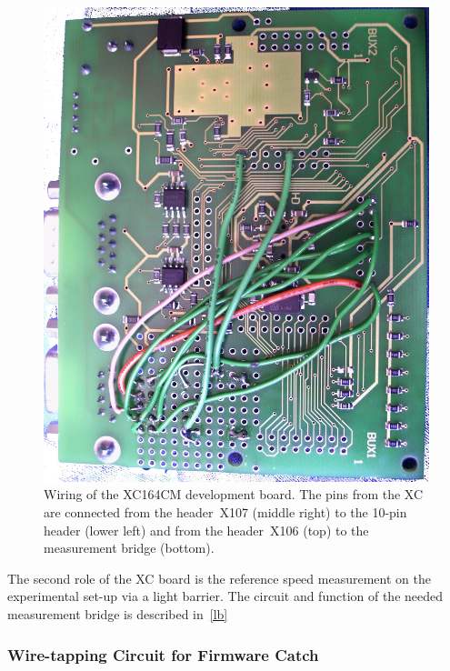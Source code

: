 \documentclass[12pt,a4paper]{article}
\begin{document}
\begin{figure}[htbp]
\begin{center}
\includegraphics[width=0.5\columnwidth]{figures/boardwiring.jpg}
\caption{\label{fig:boardwiring}
Wiring of the XC164CM development board.
The pins from the XC are connected from the header~X107 (middle right) to the 10-pin header (lower left) and from the header~X106 (top) to the measurement bridge (bottom).
}
\end{center}
\end{figure}


The second role of the XC board is the reference speed measurement on the experimental set-up via a light barrier.
The circuit and function of the needed measurement bridge is described in~\autoref{lb}






    


\subsubsection{Wire-tapping Circuit for Firmware Catch}

\end{document}
